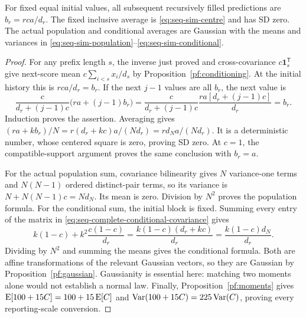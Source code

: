 \begin{proposition}
\label{seqp:recursion}
For fixed equal initial values, all subsequent recursively filled
predictions are \(b_r=rca/d_r\). The fixed inclusive average is
\eqref{eq:seq-sim-centre} and has SD zero. The actual population and
conditional averages are Gaussian with the means and variances in
\eqref{eq:seq-sim-population}--\eqref{eq:seq-sim-conditional}.
\end{proposition}
\begin{proof}
For any prefix length \(s\), the inverse just proved and cross-covariance
\(c\mathbf1_s^{\mathsf T}\) give next-score mean
\(c\sum_{i<s}x_i/d_s\) by Proposition~\ref{pf:conditioning}. At the
initial history this is \(rca/d_r=b_r\). If the next \(j-1\) values
are all \(b_r\), the next value is
\[
 \frac c{d_r+(j-1)c}\bigl(ra+(j-1)b_r\bigr)
 =\frac c{d_r+(j-1)c}
   \frac{ra[d_r+(j-1)c]}{d_r}=b_r.
\]
Induction proves the assertion. Averaging gives
\((ra+kb_r)/N=r(d_r+kc)a/(Nd_r)=rd_Na/(Nd_r)\).
It is a deterministic number, whose centered square is zero, proving
SD zero. At \(c=1\), the compatible-support argument proves the same
conclusion with \(b_r=a\).

For the actual population sum, covariance bilinearity gives
\(N\) variance-one terms and \(N(N-1)\) ordered distinct-pair terms,
so its variance is \(N+N(N-1)c=Nd_N\). Its mean is zero. Division
by \(N^2\) proves the population formula. For the conditional sum, the
initial block is fixed. Summing every entry of the matrix in
\eqref{eq:seq-complete-conditional-covariance} gives
\[
 k(1-c)+k^2\frac{c(1-c)}{d_r}
 =\frac{k(1-c)(d_r+kc)}{d_r}
 =\frac{k(1-c)d_N}{d_r}.
\]
Dividing by \(N^2\) and summing the means gives the conditional formula.
Both are affine transformations of the relevant Gaussian vectors, so
they are Gaussian by Proposition~\ref{pf:gaussian}. Gaussianity is
essential here: matching two moments alone would not establish a normal
law. Finally, Proposition~\ref{pf:moments} gives
\(\operatorname{E}[100+15C]=100+15\operatorname{E}[C]\) and
\(\operatorname{Var}(100+15C)=225\operatorname{Var}(C)\), proving every reporting-scale conversion.
\end{proof}

